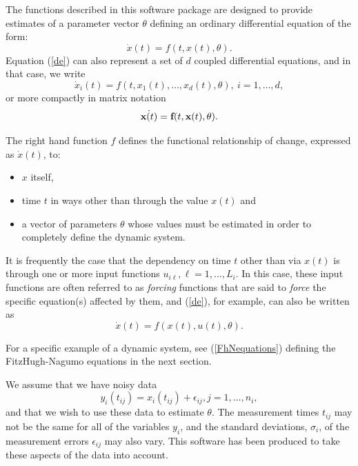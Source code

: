 \documentclass{article}
\newcommand{\fbold}    {\mbox{\bf f}}
\newcommand{\xbold}    {\mbox{\bf x}}
\begin{document}
The functions described in this software package are designed to provide estimates of a parameter
vector $\theta$ defining an ordinary differential equation of the form:
\begin{equation} \label{de}
  \dot{x}(t) = f(t, x(t), \theta).
\end{equation}
Equation (\ref{de}) can also represent a set of $d$ coupled differential equations, and in that
case, we write
\begin{equation} \label{deindex}
  \dot{x}_i(t) = f(t, x_1(t), \ldots, x_d(t), \theta), \ i = 1, \ldots, d,
\end{equation}
or more compactly in matrix notation
\begin{equation} \label{devec}
  \dot{\xbold(t)} = \fbold(t, \xbold(t), \theta).
\end{equation}

The right hand function $f$ defines the functional relationship of change, expressed as
$\dot{x}(t)$, to:
\begin{itemize}
  \item $x$ itself,
  \item time $t$ in ways other than through the value $x(t)$ and
  \item a vector of parameters $\theta$ whose values must be estimated in order to completely
  define the dynamic system.
\end{itemize}
It is frequently the case that the dependency on time $t$ other than via $x(t)$ is through one or
more input functions $u_{i\ell}, \ell = 1,...,L_i$.  In this case, these input functions are often
referred to as \emph{forcing} functions that are said to \emph{force} the specific equation(s)
affected by them, and (\ref{de}), for example, can also be written as
\begin{equation} \label{deforce}
  \dot{x}(t) = f(x(t), u(t), \theta).
\end{equation}

For a specific example of a dynamic system, see (\ref{FhNequations}) defining the FitzHugh-Nagumo
equations in the next section.

We assume that we have noisy data
\[
  y_i(t_{ij}) = x_i(t_{ij}) + \epsilon_{ij}, j=1,\ldots,n_i,
\]
and that we wish to use these data to estimate  $\theta$. The measurement times $t_{ij}$ may not be
the same for all of the variables $y_i$, and the standard deviations, $\sigma_i$, of the
measurement errors $\epsilon_{ij}$ may also vary. This software has been produced to take these
aspects of the data into account.
\end{document}
